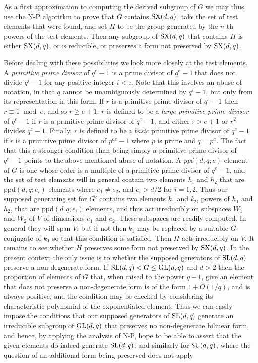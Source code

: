 \documentclass[12pt]{article}
\def\SL{{\rm SL}}
\def\GL{{\rm GL}}
\def\SU{{\rm SU}}
\def\SX{{\rm SX}}
\begin{document}
As a first approximation to computing the derived subgroup of $G$ we may thus
use the N-P algorithm to prove that $G$ contains $\SX(d,q)$, take the set of
test elements that were found, and set $H$ to be the group generated by
the $n$-th powers of the test elements.  Then any subgroup of $\SX(d,q)$ that contains
$H$ is either $\SX(d,q)$, or is reducible, or preserves a form not preserved
by $\SX(d,q)$.

Before dealing with these possibilities we look more closely at the test elements. 
A {\it primitive prime divisor} of $q^e-1$ is a prime divisor of
$q^e-1$ that does not divide $q^i-1$ for any positive integer $i<e$.  Note
that this involves an abuse of notation, in that $q$ cannot be unambiguously
determined by $q^e-1$, but only from its representation in this form.  If
$r$ is a primitive prime divisor of $q^e-1$ then $r\equiv 1\bmod e$, and so
$r\ge e+1$.  $r$ is defined to be a {\it large primitive prime divisor} of
$q^e-1$ if $r$ is a primitive prime divisor of $q^e-1$, and either $r>e+1$
or $r^2$ divides $q^e-1$.  Finally, $r$ is defined to be a {\it basic}
primitive prime divisor of $q^e-1$ if $r$ is a primitive prime divisor of 
$p^{ae}-1$ where $p$ is prime and $q=p^a$.  The fact that this a stronger 
condition than being simply a primitive prime divisor of $q^e-1$ points to
the above mentioned abuse of notation.  A {\it ppd}$(d,q;e)$ element of
$G$ is one whose order is a multiple of a primitive prime divisor of
$q^e-1$, and the set of test elements will in general contain two elements
$h_1$ and $h_2$ that are ppd$(d,q;e_i)$ elements where $e_1\ne e_2$,
and $e_i>d/2$ for $i=1,2$.  Thus our supposed generating set for $G'$ contains
two elements $k_1$ and $k_2$, powers of $h_1$ and $h_2$, that are
ppd$(d,q;e_i)$ elements, and thus act irreducibly on subspaces $W_1$ and $W_2$
of $V$ of dimensions $e_1$ and $e_2$.  These subspaces are readily computed.
In general they will span $V$; but if not then $k_1$ may be replaced by a
suitable $G$-conjugate of $k_1$ so that this condition is satisfied.  Then
$H$ acts irreducibly on $V$.  It remains to see whether $H$ preserves
some form not preserved by $\SX(d,q)$.  In the present context the only
issue is to whether the supposed generators of $\SL(d,q)$ preserve a 
non-degenerate form.
If $\SL(d,q)<G\le\GL(d,q)$ and $d>2$ then the proportion of elements of $G$ that, when
raised to the power $q-1$, give an element that does not preserve a 
non-degenerate form is of the form $1+O(1/q)$, and is always positive, 
and the condition may be checked by considering its characteristic
polynomial of the exponentiated element.  Thus we can easily impose the conditions that our supposed generators of $\SL(d,q)$ generate an irreducible subgroup of $\GL(d,q)$ that 
preserves no non-degenerate bilinear form, and hence, by applying the
analysis of N-P, hope to be able to assert that the given elements do
indeed generate $\SL(d,q)$; and similarly for $\SU(d,q)$, where the
question of an additional  form being preserved does not apply.
\end{document}
